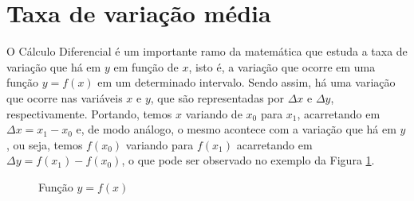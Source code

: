\documentclass[
	12pt,				%
	openright,			%
    twoside,			%
	a4paper,			%
	chapter=TITLE,		%
	english,			%
	french,				%
	spanish,			%
	brazil				%
	]{abntex2}
\numberwithin{lema}{chapter}
\numberwithin{teorema}{chapter}
\numberwithin{definicao}{chapter}
\numberwithin{exemplo}{chapter}
\numberwithin{figure}{chapter}
\begin{document}
\section{Taxa de variação média}
\label{secao_1}
O Cálculo Diferencial é um importante ramo da matemática que estuda a taxa de variação que há em $y$ em função de $x$, isto é, a variação que ocorre em uma função $y=f(x)$ em um determinado intervalo. Sendo assim, há uma variação que ocorre nas variáveis $x$ e $y$, que são representadas por $\Delta x$ e $\Delta y$, respectivamente. Portando, temos $x$ variando de $x_0$ para $x_1$, acarretando em $\Delta x = x_1 - x_0$ e, de modo análogo, o mesmo acontece com a variação que há em $y$, ou seja, temos $f(x_0)$ variando para $f(x_1)$ acarretando em $\Delta y = f(x_1) - f(x_0)$, o que pode ser observado no exemplo da Figura \ref{funcao_1}.

\begin{figure}[h]
	\caption{Função $y = f(x)$}
	\centering
	\label{funcao_1}
\end{figure}
\end{document}
